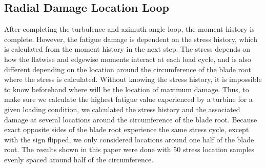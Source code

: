 \documentclass[11pt,letterpaper]{article}
\begin{document}
\subsection{Radial Damage Location Loop}

After completing the turbulence and azimuth angle loop, the moment history is complete. However, the fatigue damage is dependent on the stress history, which is calculated from the moment history in the next step. The stress depends on how the flatwise and edgewise moments interact at each load cycle, and is also different depending on the location around the circumference of the blade root where the stress is calculated. Without knowing the stress history, it is impossible to know beforehand where will be the location of maximum damage. Thus, to make sure we calculate the highest fatigue value experienced by a turbine for a given loading condition, we calculated the stress history and the associated damage at several locations around the circumference of the blade root. Because exact opposite sides of the blade root experience the same stress cycle, except with the sign flipped, we only considered locations around one half of the blade root. The results shown in this paper were done with 50 stress location samples evenly spaced around half of the circumference.
\end{document}
